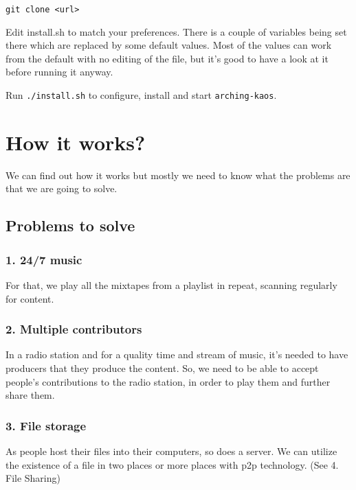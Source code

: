 \documentclass[12pt]{report}
\begin{document}
\begin{verbatim}
git clone <url>
\end{verbatim}

Edit install.sh to match your preferences. There
is a couple of variables being set there which are replaced by some
default values. Most of the values can work from the default with no
editing of the file, but it's good to have a look at it before running
it anyway.

Run \texttt{./install.sh} to configure, install and start
\texttt{arching-kaos}.

\section{How it works?}\label{how-it-works}

We can find out how it works but mostly we need to know what the
problems are that we are going to solve.

\subsection{Problems to solve}\label{problems-to-solve}


\subsubsection{1. 24/7 music}\label{music}

For that, we play all the mixtapes from a playlist in repeat, scanning
regularly for content.


\subsubsection{2. Multiple contributors}\label{multiple-contributors}

In a radio station and for a quality time and stream of music, it's
needed to have producers that they produce the content. So, we need to
be able to accept people's contributions to the radio station, in order
to play them and further share them.


\subsubsection{3. File storage}\label{file-storage}

As people host their files into their computers, so does a server. We
can utilize the existence of a file in two places or more places with
p2p technology. (See 4. File Sharing)
\end{document}

